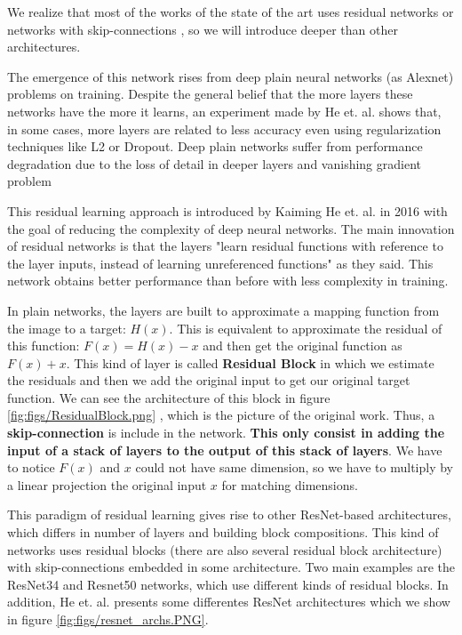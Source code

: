We realize that most of the works of the state of the art  uses residual networks \cite{myronenko20183d} \cite{learnvolrepreCODE} or networks with skip-connections \cite{2020inpainting} \cite{superresolution} \cite{bermudez2018t1autoencoder}, so we will introduce deeper than other architectures.

The emergence of this network rises from deep plain neural networks (as Alexnet) problems on training.  Despite the general belief that the more layers these networks have the more it learns, an experiment made by He et. al. \cite{reslearning} shows that, in some cases, more layers are related to less accuracy even using regularization techniques like L2 or Dropout. Deep plain networks suffer from performance degradation due to the loss of detail in deeper layers and vanishing gradient problem

This residual learning approach is introduced by Kaiming He et. al. in 2016 \cite{reslearning} with the goal of reducing the complexity of deep neural networks. The main innovation of residual networks is that the layers "learn residual functions with reference to the layer inputs, instead of learning unreferenced functions" \cite{reslearning} as they said. This network obtains better performance than before with less complexity in training.

In plain networks, the layers are built to approximate a mapping function from the image to a target: $H(x)$. This is equivalent to approximate the residual of this function: $F(x) = H(x)-x$ and then get the original function as $F(x)+x$. This kind of layer is called \textbf{Residual Block} in which we estimate the residuals and then we add the original input to get our original target function. We can see the architecture of this block in figure \ref{fig:figs/ResidualBlock.png} , which is the picture of the original work. Thus, a \textbf{skip-connection} is include in the network. \textbf{This only consist in adding the input of a stack of layers to the output of this stack of layers}. We have to notice $F(x)$ and $x$ could not have same dimension, so we have to multiply by a linear projection the original input $x$ for matching dimensions. 



This paradigm of residual learning gives rise to other ResNet-based architectures, which differs in number of layers and building block compositions. This kind of networks uses residual blocks (there are also several residual block architecture) with skip-connections embedded in some architecture. Two main examples are the ResNet34 and Resnet50 networks, which use different kinds of residual blocks. In addition, He et. al. presents some differentes ResNet architectures which we show in figure \ref{fig:figs/resnet_archs.PNG}. 

